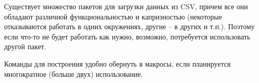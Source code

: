 Существует множество пакетов для загрузки данных из CSV, причем все они обладают различной функциональностью и капризностью (некоторые отказываются работать в одних окружениях, другие -- в других и т.п.). Поэтому если что-то не будет работать как нужно, возможно, потребуется использовать другой пакет.

Команды для построения удобно обернуть в макросы, если планируется многократное (больше двух) использование.

